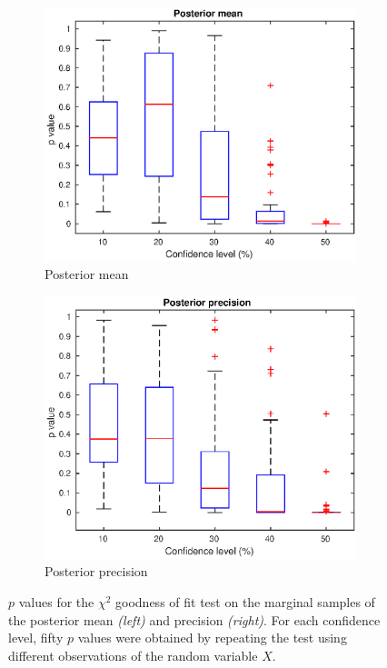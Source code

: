 \documentclass[a4paper,10pt]{article}
\begin{document}
\begin{figure}[htb]
\centering

\begin{subfigure}[b]{0.45\textwidth}
\includegraphics[width=\textwidth]{pvalue_mean.eps}
\caption{Posterior mean}
\label{pvalue_mean}
\end{subfigure}
\begin{subfigure}[b]{0.45\textwidth}
\includegraphics[width=\textwidth]{pvalue_precision.eps}
\caption{Posterior precision}
\label{pvalue_precision}
\end{subfigure}

\caption{$p$ values for the $\chi^2$ goodness of fit test on the marginal samples of the posterior mean \emph{(left)} and precision \emph{(right)}. For each confidence level, fifty $p$ values were obtained by repeating the test using different observations of the random variable $X$.}
\end{figure}
\end{document}
